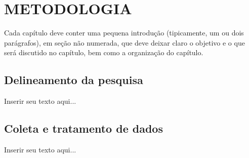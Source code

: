 
\chapter{METODOLOGIA}
\label{chap:metodologia}

Cada capítulo deve conter uma pequena introdução (tipicamente, um ou dois parágrafos), em seção não numerada, que deve deixar claro o objetivo e o que será discutido no capítulo, bem como a organização do capítulo.

\section{Delineamento da pesquisa}
\label{sec:delineamento_da_pesquisa}

Inserir seu texto aqui...

\section{Coleta e tratamento de dados}
\label{sec:coleta_e_tratamento_de_dados}

Inserir seu texto aqui...